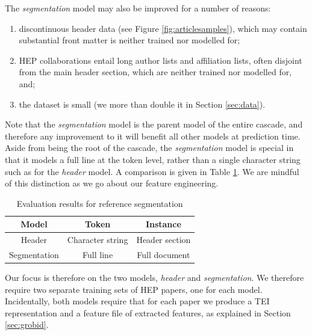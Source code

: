 The \emph{segmentation} model may also be improved for a number of reasons:

\begin{enumerate}
\item discontinuous header data (see Figure \ref{fig:articlesamples}), which may contain substantial front matter is neither trained nor modelled for;
\item HEP collaborations entail long author lists and affiliation lists, often disjoint from the main header section, which are neither trained nor modelled for, and;
\item the dataset is small (we more than double it in Section \ref{sec:data}).
\end{enumerate}

Note that the \emph{segmentation} model is the parent model of the entire cascade, and therefore any improvement to it will benefit all other models at prediction time. Aside from being the root of the cascade, the \emph{segmentation} model is special in that it models a full line at the token level, rather than a single character string such as for the \emph{header} model. A comparison is given in Table \ref{table:headervssegmentation}. We are mindful of this distinction as we go about our feature engineering.

\begin{table}[h]
\begin{center}
\begin{tabular}{|c|c|c|}
\hline
Model & Token & Instance \\
\hline
Header & Character string & Header section \\
\hline
Segmentation & Full line & Full document \\
\hline
\end{tabular}
\caption[Comparison of token and instance entities for \emph{header} and \emph{segmentation} models. For information on \emph{fields} tagged by these models, see Section \ref{sec:grobid}.]{Evaluation results for reference segmentation}
\label{table:headervssegmentation}
\end{center}
\end{table}

Our focus is therefore on the two models, \emph{header} and \emph{segmentation}. We therefore require two separate training sets of HEP papers, one for each model. Incidentally, both models require that for each paper we produce a TEI representation and a feature file of extracted features, as explained in Section \ref{sec:grobid}.

